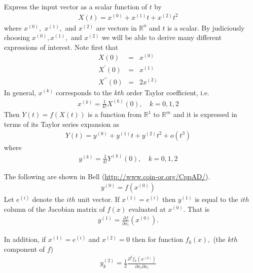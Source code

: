 \documentclass[11pt]{article}
\newcommand{\D}[2]{ \frac{\partial #1}{\partial #2} }
\newcommand{\DD}[3]{ \frac{\partial^2 #1}{\partial #2 \partial #3} }
\renewcommand{\_}{{\char"5F}}
\renewcommand{\{}{{\char"7B}}
\renewcommand{\}}{{\char"7D}}
\renewcommand{\^}{{\char"0D}}
\renewcommand{\'}{{\char"0D}}
\begin{document}
Express the input vector as a scalar function of $t$ by
\begin{eqnarray}
X(t) = x^{(0)} +  x^{(1)} t +  x^{(2)} t^{2}
\end{eqnarray}
where $ x^{(0)},$ $x^{(1)},$ and $x^{(2)}$ are vectors in $ \mathbb{R}^{n}$  and $t$ is a scalar.  By judiciously choosing $x^{(0)}, x^{(1)},$ and $x^{(2)}$ we will be able to derive many different expressions of interest.  Note first that
\begin{eqnarray*}
X(0) &=& x^{(0)} \\
X^{\prime}(0) &=& x^{(1)} \\
X^{\prime \prime }(0) &=& 2 x^{(2)}
\end{eqnarray*}
In general,  $x^{(k)}$ corresponds to the $kth$ order Taylor coefficient, i.e.
\begin{eqnarray}
x^{(k)} = \frac{1}{k!}X^{(k)}(0), \quad k = 0, 1, 2  \label{eq:xTaylorCoeff}
\end{eqnarray}
Then $Y(t) = f(X(t))$ is a function from $ \mathbb{R}^{1}$ to $ \mathbb{R}^{m}$ and it is expressed in terms of its Taylor series expansion as
\begin{eqnarray}
Y(t)  = y^{(0)} +  y^{(1)} t +  y^{(2)} t^{2} + o(t^{3})
\end{eqnarray}
where
\begin{eqnarray}
y^{(k)} = \frac{1}{k!} Y^{(k)}(0), \quad k = 0, 1, 2  \label{eq:yTaylorCoeff}
\end{eqnarray}



The following are shown in Bell  (\url{http://www.coin-or.org/CppAD/}).
\begin{eqnarray}
y^{(0)} = f(x^{(0)}) \label{eq:forward0Result}
\end{eqnarray} 
Let $e^{(i)}$ denote the $ith$ unit vector.  If $x^{(1)} = e^{(i)}$ then $y^{(1)}$ is equal to the $ith$ column of the Jacobian matrix of $f(x)$ evaluated at $x^{(0)}.$ That is
\begin{eqnarray}
y^{(1)} = \D{f}{x_{i}}(x^{(0)}).  \label{eq:forward1Result}
\end{eqnarray}

In addition, if $x^{(1)} = e^{(i)}$ and $x^{(2)} = 0$ then for function $f_{k}(x),$ (the $kth$ component of $f$)
\begin{eqnarray}
y^{(2)}_{k} =  \frac{1}{2} \DD{f_{k}(x^{(0)})}{x_{i}}{x_{i}}  \label{eq:forward2Resulta}
\end{eqnarray}
\end{document}
